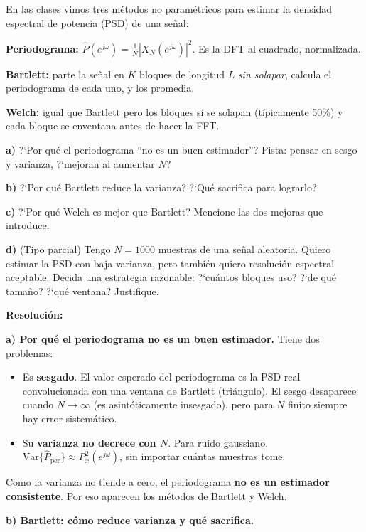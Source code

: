 \documentclass[11pt, a4paper]{article}
\newcommand{\res}{\smallskip\noindent\textbf{\color{enunline}Resoluci\'on:}\smallskip}
\begin{document}
\begin{enun}
En las clases vimos tres m\'etodos no param\'etricos para estimar la
densidad espectral de potencia (PSD) de una se\~nal:

\smallskip
\textbf{Periodograma:} $\hat{P}(e^{j\omega}) = \frac{1}{N}|X_N(e^{j\omega})|^2$.
Es la DFT al cuadrado, normalizada.

\textbf{Bartlett:} parte la se\~nal en $K$ bloques de longitud $L$
\emph{sin solapar}, calcula el periodograma de cada uno, y los promedia.

\textbf{Welch:} igual que Bartlett pero los bloques s\'i se solapan
(t\'ipicamente 50\%) y cada bloque se enventana antes de hacer la FFT.

\smallskip
\textbf{a)} ?`Por qu\'e el periodograma ``no es un buen estimador''?
Pista: pensar en sesgo y varianza, ?`mejoran al aumentar $N$?

\textbf{b)} ?`Por qu\'e Bartlett reduce la varianza? ?`Qu\'e sacrifica para
lograrlo?

\textbf{c)} ?`Por qu\'e Welch es mejor que Bartlett?
Mencione las dos mejoras que introduce.

\textbf{d)} (Tipo parcial)
Tengo $N = 1000$ muestras de una se\~nal aleatoria.
Quiero estimar la PSD con baja varianza, pero tambi\'en quiero resoluci\'on
espectral aceptable.
Decida una estrategia razonable: ?`cu\'antos bloques uso? ?`de qu\'e tama\~no?
?`qu\'e ventana? Justifique.
\end{enun}

\res

\textbf{a) Por qu\'e el periodograma no es un buen estimador.}
Tiene dos problemas:
\begin{itemize}
  \item Es \textbf{sesgado}. El valor esperado del periodograma es la PSD real
    convolucionada con una ventana de Bartlett (tri\'angulo).
    El sesgo desaparece cuando $N \to \infty$ (es asint\'oticamente insesgado),
    pero para $N$ finito siempre hay error sistem\'atico.
  \item Su \textbf{varianza no decrece con $N$}. Para ruido gaussiano,
    $\text{Var}\{\hat{P}_{\text{per}}\} \approx P_x^2(e^{j\omega})$, sin importar
    cu\'antas muestras tome.
\end{itemize}
Como la varianza no tiende a cero, el periodograma \textbf{no es un estimador
consistente}. Por eso aparecen los m\'etodos de Bartlett y Welch.

\textbf{b) Bartlett: c\'omo reduce varianza y qu\'e sacrifica.}
\end{document}
